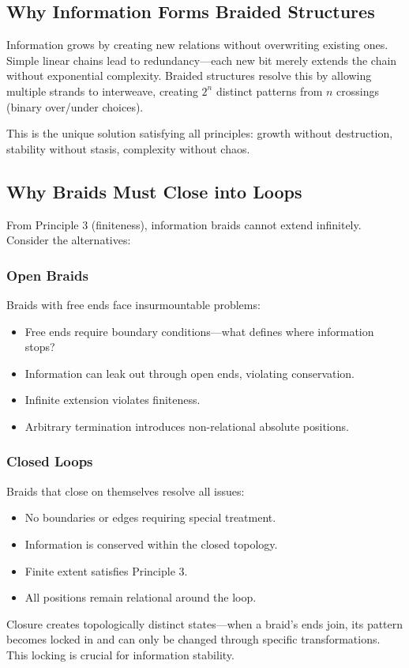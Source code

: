 \documentclass{article}
\begin{document}
\subsection{Why Information Forms Braided Structures}
Information grows by creating new relations without overwriting existing ones. Simple linear chains lead to redundancy—each new bit merely extends the chain without exponential complexity. Braided structures resolve this by allowing multiple strands to interweave, creating $2^n$ distinct patterns from $n$ crossings (binary over/under choices).

This is the unique solution satisfying all principles: growth without destruction, stability without stasis, complexity without chaos.

\subsection{Why Braids Must Close into Loops}
From Principle 3 (finiteness), information braids cannot extend infinitely. Consider the alternatives:

\subsubsection{Open Braids}
Braids with free ends face insurmountable problems:
\begin{itemize}
\item Free ends require boundary conditions—what defines where information stops?
\item Information can leak out through open ends, violating conservation.
\item Infinite extension violates finiteness.
\item Arbitrary termination introduces non-relational absolute positions.
\end{itemize}

\subsubsection{Closed Loops}
Braids that close on themselves resolve all issues:
\begin{itemize}
\item No boundaries or edges requiring special treatment.
\item Information is conserved within the closed topology.
\item Finite extent satisfies Principle 3.
\item All positions remain relational around the loop.
\end{itemize}
Closure creates topologically distinct states—when a braid's ends join, its pattern becomes locked in and can only be changed through specific transformations. This locking is crucial for information stability.
\end{document}

